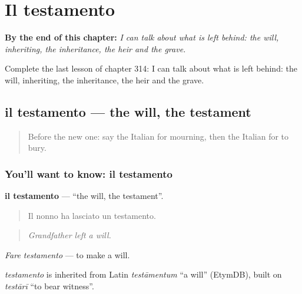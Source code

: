 
\chapter{Il testamento}
\label{ch:it-il-testamento}

\begin{chapteropening}
\textbf{By the end of this chapter:} \emph{I can talk about what is left behind: the will, inheriting, the inheritance, the heir and the grave.}

Complete the last lesson of chapter 314: I can talk about what is left behind: the will, inheriting, the inheritance, the heir and the grave.
\end{chapteropening}

\section[il testamento]{il testamento — the will, the testament}

\label{lesson:IT-C314-testamento}



\begin{quote}
Before the new one: say the Italian for mourning, then the Italian for to bury.
\end{quote}

\subsection*{You'll want to know: il testamento}
\textbf{il testamento} — \textquotedblleft{}the will, the testament\textquotedblright{}.

\begin{quote}
Il nonno ha lasciato un testamento.
\end{quote}

\begin{quote}
\emph{Grandfather left a will.}
\end{quote}

\emph{Fare testamento} — to make a will.

\begin{cousinweb}
\emph{testamento} is inherited from Latin \emph{testāmentum} \textquotedblleft{}a will\textquotedblright{} (EtymDB), built on \emph{testārī} \textquotedblleft{}to bear witness\textquotedblright{}.
\end{cousinweb}

